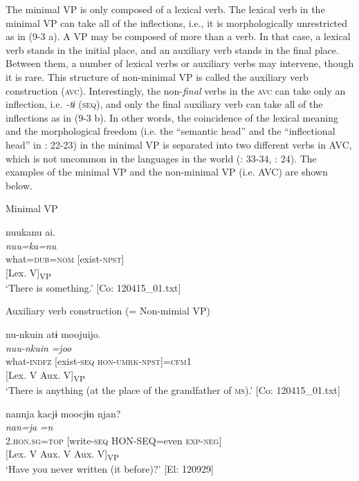 The minimal VP is only composed of a lexical verb. The lexical verb in the minimal VP can take all of the inflections, i.e., it is morphologically unrestricted as in (9-3 a). A VP may be composed of more than a verb. In that case, a lexical verb stands in the initial place, and an auxiliary verb stands in the final place. Between them, a number of lexical verbs or auxiliary verbs may intervene, though it is rare. This structure of non-minimal VP is called the auxiliary verb construction (\textsc{avc}). Interestingly, the non-\textit{final} verbs in the \textsc{avc} can take only an inflection, i.e. \textit{{}-tɨ} (\textsc{seq}), and only the final auxiliary verb can take all of the inflections as in (9-3 b). In other words, the coincidence of the lexical meaning and the morphological freedom (i.e. the “semantic head” and the “inflectional head” in \citealt{Anderson2006}: 22-23) in the minimal VP is separated into two different verbs in AVC, which is not uncommon in the languages in the world (\citealt{Lehmann1995}: 33-34, \citealt{Anderson2006}: 24). The examples of the minimal VP and the non-minimal VP (i.e. AVC) are shown below.

\ea  \label{ex:9.4}

\exi{} Minimal VP 

\ea %
 \gllll  nuukanu  ai.\\
      \textit{nuu=ka=nu}  \textit{}\\
      what=\textsc{dub}=\textsc{nom}  [exist-\textsc{npst}]\\
       {} {[Lex. V]\textsubscript{VP}}\\
      \glt       ‘There is something.’ [Co: 120415\_01.txt]

\exi{}  Auxiliary verb construction (= Non-mimial VP)

\ex \label{ex:.b} %
    \gllll  nu-nkuin  atɨ  moojuijo.\\
      \textit{nuu-nkuin}  \textit{}  \textit{=joo}\\
      what-\textsc{indfz}  [exist-\textsc{seq}  \textsc{hon}-\textsc{umrk}-\textsc{npst}]=\textsc{cfm}1\\
      {}  {[Lex. V}  {Aux. V]\textsubscript{VP}}\\
      \glt       ‘There is anything (at the place of the grandfather of \textsc{ms}).’ [Co: 120415\_01.txt]

\ex \label{ex:.c} %
    \gllll  nannja  kacjɨ  moocjɨn  njan?\\
      \textit{nan=ja}  \textit{}  \textit{=n}  \textit{}\\
      2.\textsc{hon}.\textsc{sg}=\textsc{top}  [write-\textsc{seq}  HON-SEQ=even  \textsc{exp}-\textsc{neg}]\\
       {} {[Lex. V}  {Aux. V}  {Aux. V]\textsubscript{VP}}\\
      \glt       ‘Have you never written (it before)?’ [El: 120929]
    \z
\z

